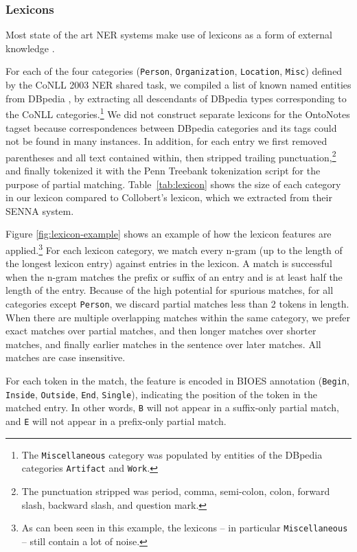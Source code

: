 \documentclass[11pt,letterpaper]{article}
\begin{document}
\subsubsection{Lexicons}
Most state of the art NER systems make use of lexicons as a form of external knowledge \cite{ratinov2009,passos2014}. 

For each of the four categories ({\tt Person}, {\tt Organization}, {\tt Location}, {\tt Misc}) defined by the CoNLL 2003 NER shared task, we compiled a list of known named entities from DBpedia \cite{auer2007dbpedia}, by extracting all descendants of DBpedia types corresponding to the CoNLL categories.\footnote{The {\tt Miscellaneous} category was populated by entities of the DBpedia categories {\tt Artifact} and {\tt Work}.} We did not construct separate lexicons for the OntoNotes tagset because correspondences between DBpedia categories and its tags could not be found in many instances. In addition, for each entry we first removed parentheses and all text contained within, then stripped trailing punctuation,\footnote{The punctuation stripped was period, comma, semi-colon, colon, forward slash, backward slash, and question mark.} and finally tokenized it with the Penn Treebank tokenization script for the purpose of partial matching. Table~\ref{tab:lexicon} shows the size of each category in our lexicon compared to Collobert's lexicon, which we extracted from their SENNA system.

Figure \ref{fig:lexicon-example} shows an example of how the lexicon features are applied.\footnote{As can been seen in this example, the lexicons \--- in particular {\tt Miscellaneous} \--- still contain a lot of noise. 
} For each lexicon category, we match every n-gram (up to the length of the longest lexicon entry) against entries in the lexicon. A match is successful when the n-gram matches the prefix or suffix of an entry and is at least half the length of the entry. Because of the high potential for spurious matches, for all categories except {\tt Person}, we discard partial matches less than 2 tokens in length. When there are multiple overlapping matches within the same category, we prefer exact matches over partial matches, and then longer matches over shorter matches, and finally earlier matches in the sentence over later matches. All matches are case insensitive.

For each token in the match, the feature is encoded in BIOES annotation ({\tt Begin}, {\tt Inside}, {\tt Outside}, {\tt End}, {\tt Single}), indicating the position of the token in the matched entry. In other words, {\tt B} will not appear in a suffix-only partial match, and {\tt E} will not appear in a prefix-only partial match.
\end{document}
